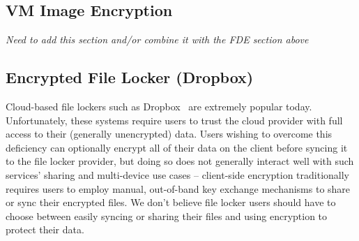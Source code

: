 




\subsection{VM Image Encryption}

{\em Need to add this section and/or combine it with the FDE section above}

\subsection{Encrypted File Locker (Dropbox)}

Cloud-based file lockers such as Dropbox~\cite{dropbox} are extremely
popular today. Unfortunately, these systems require users to trust the
cloud provider with full access to their (generally unencrypted)
data. Users wishing to overcome this deficiency can optionally encrypt
all of their data on the client before syncing it to the file locker
provider, but doing so does not generally interact well with such
services' sharing and multi-device use cases -- client-side encryption
traditionally requires users to employ manual, out-of-band key
exchange mechanisms to share or sync their encrypted files. We don't
believe file locker users should have to choose between easily syncing
or sharing their files and using encryption to protect their data.

